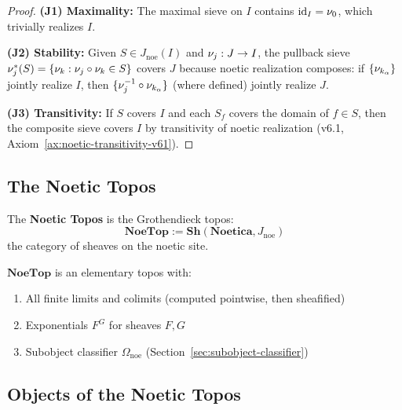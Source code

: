 \begin{proof}
\textbf{(J1) Maximality:} The maximal sieve on $I$ contains $\mathrm{id}_I = \nu_{0}$,
which trivially realizes $I$.

\textbf{(J2) Stability:} Given $S \in J_{\mathrm{noe}}(I)$ and $\nu_{j} : J \to I$,
the pullback sieve $\nu_{j}^*(S) = \{\nu_{k} : \nu_{j} \circ \nu_{k} \in S\}$
covers $J$ because noetic realization composes: if $\{\nu_{k_\alpha}\}$ jointly
realize $I$, then $\{\nu_{j}^{-1} \circ \nu_{k_\alpha}\}$ (where defined) jointly
realize $J$.

\textbf{(J3) Transitivity:} If $S$ covers $I$ and each $S_f$ covers the domain
of $f \in S$, then the composite sieve covers $I$ by transitivity of noetic
realization (v6.1, Axiom~\ref{ax:noetic-transitivity-v61}).
\end{proof}

\subsection{The Noetic Topos}
\label{subsec:noetic-topos-def}

\begin{definition}
\label{def:noetic-topos}
The \textbf{Noetic Topos} is the Grothendieck topos:
\[
  \mathbf{NoeTop} := \mathbf{Sh}(\mathbf{Noetica}, J_{\mathrm{noe}})
\]
the category of sheaves on the noetic site.
\end{definition}

\begin{theorem}
\label{thm:noetic-topos-well-defined}
$\mathbf{NoeTop}$ is an elementary topos with:
\begin{enumerate}[label=(\roman*)]
  \item All finite limits and colimits (computed pointwise, then sheafified)
  \item Exponentials $F^G$ for sheaves $F, G$
  \item Subobject classifier $\Omega_{\mathrm{noe}}$ (Section~\ref{sec:subobject-classifier})
\end{enumerate}
\end{theorem}

\subsection{Objects of the Noetic Topos}
\label{subsec:noetic-topos-objects}

